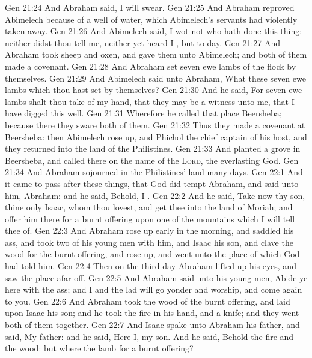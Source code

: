 \vs Gen 21:24 And Abraham said, I will swear.
\vs Gen 21:25 And Abraham reproved Abimelech because of a well of water, which Abimelech's servants had violently taken away.
\vs Gen 21:26 And Abimelech said, I wot not who hath done this thing: neither didst thou tell me, neither yet heard I , but to day.
\vs Gen 21:27 And Abraham took sheep and oxen, and gave them unto Abimelech; and both of them made a covenant.
\vs Gen 21:28 And Abraham set seven ewe lambs of the flock by themselves.
\vs Gen 21:29 And Abimelech said unto Abraham, What  these seven ewe lambs which thou hast set by themselves?
\vs Gen 21:30 And he said, For  seven ewe lambs shalt thou take of my hand, that they may be a witness unto me, that I have digged this well.
\vs Gen 21:31 Wherefore he called that place Beersheba; because there they sware both of them.
\vs Gen 21:32 Thus they made a covenant at Beersheba: then Abimelech rose up, and Phichol the chief captain of his host, and they returned into the land of the Philistines.
\vs Gen 21:33 And  planted a grove in Beersheba, and called there on the name of the \textsc{Lord}, the everlasting God.
\vs Gen 21:34 And Abraham sojourned in the Philistines' land many days.
\vs Gen 22:1 And it came to pass after these things, that God did tempt Abraham, and said unto him, Abraham: and he said, Behold,  I .
\vs Gen 22:2 And he said, Take now thy son, thine only  Isaac, whom thou lovest, and get thee into the land of Moriah; and offer him there for a burnt offering upon one of the mountains which I will tell thee of.
\vs Gen 22:3 And Abraham rose up early in the morning, and saddled his ass, and took two of his young men with him, and Isaac his son, and clave the wood for the burnt offering, and rose up, and went unto the place of which God had told him.
\vs Gen 22:4 Then on the third day Abraham lifted up his eyes, and saw the place afar off.
\vs Gen 22:5 And Abraham said unto his young men, Abide ye here with the ass; and I and the lad will go yonder and worship, and come again to you.
\vs Gen 22:6 And Abraham took the wood of the burnt offering, and laid  upon Isaac his son; and he took the fire in his hand, and a knife; and they went both of them together.
\vs Gen 22:7 And Isaac spake unto Abraham his father, and said, My father: and he said, Here  I, my son. And he said, Behold the fire and the wood: but where  the lamb for a burnt offering?
